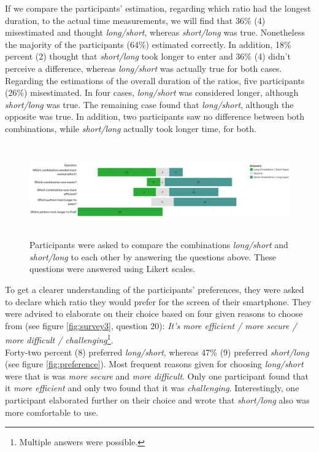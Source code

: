 If we compare the participants' estimation, regarding which ratio had the longest duration, to the actual time measurements, we will find that 36\% (4) misestimated and thought \textit{long/short}, whereas \textit{short/long} was true. Nonetheless the majority of the participants (64\%) estimated correctly. In addition, 18\% percent (2) thought that \textit{short/long} took longer to enter and 36\% (4) didn't perceive a difference, whereas \textit{long/short} was actually true for both cases. Regarding the estimations of the overall duration of the ratios, five participants (26\%) misestimated. In four cases, \textit{long/short} was considered longer, although \textit{short/long} was true. The remaining case found that \textit{long/short}, although the opposite was true. In addition, two participants saw no difference between both combinations, while \textit{short/long}  actually took longer time, for both. \\

\begin{figure}[t!]
\centering
\includegraphics[width=15cm, height=4cm]{Chapters/graphics/Likert2.png}
\caption{Participants were asked to compare the combinations \textit{long/short} and \textit{short/long} to each other by answering the questions above. These questions were answered using Likert scales. }
\label{fig:likert2}
\end{figure}

To get a clearer understanding of the participants' preferences, they were asked to declare which ratio they would prefer for the screen of their smartphone. They were advised to elaborate on their choice based on four given reasons to choose from (see figure \ref{fig:survey3}, question 20): \textit{It's more efficient / more secure / more difficult / challenging}\footnote{Multiple answers were possible.}.\\
Forty-two percent (8) preferred \textit{long/short}, whereas 47\% (9) preferred \textit{short/long} (see figure \ref{fig:preference}). Most frequent reasons given for choosing \textit{long/short} were that is was \textit{more secure} and \textit{more difficult}. Only one participant found that it \textit{more efficient} and only two found that it was \textit{challenging}. Interestingly, one participant elaborated further on their choice and wrote that \textit{short/long} also was more comfortable to use.\\

